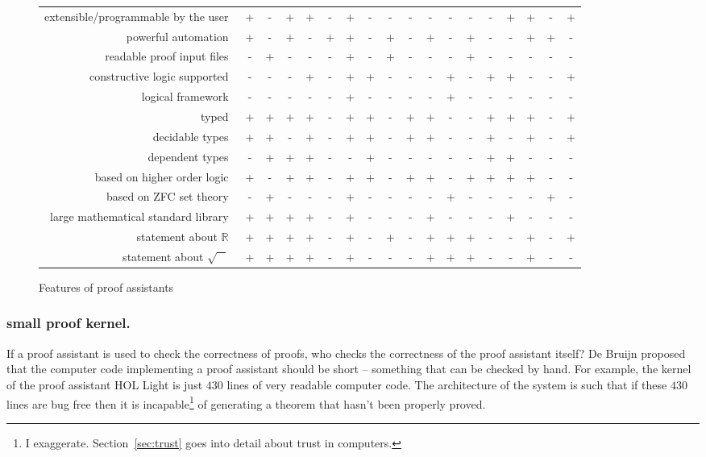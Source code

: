 \documentclass{llncs}
\newcommand{\ring}[1]{\mathbb{#1}}
\begin{document}
\begin{figure}
\begin{tabular}{|r|ccccc|ccccc|ccccc|cc|}
extensible/programmable by the user~
&+ &- &+ &+  &- &+ &- &-  &- &- &- &-  &- &+ &+ &-  &+ 
\\
powerful automation~
&+ &- &+ &-  &+ &+ &- &+  &- &+ &- &+  &- &- &+ &+  &- 
\\
readable proof input files~
&- &+ &- &-  &- &+ &- &+  &- &- &- &+  &- &- &- &-  &- 
\\
\hline
constructive logic supported~
&- &- &- &+  &- &+ &+ &-  &- &- &+ &-  &+ &+ &- &-  &+ 
\\
logical framework~
&- &- &- &-  &- &+ &- &-  &- &- &+ &-  &- &- &- &-  &- 
\\
typed~
&+ &+ &+ &+  &- &+ &+ &-  &+ &+ &- &-  &+ &+ &+ &-  &+ 
\\
decidable types~
&+ &+ &- &+  &- &+ &+ &-  &+ &+ &- &-  &+ &- &+ &-  &+ 
\\
dependent types~
&- &+ &+ &+  &- &- &+ &-  &- &- &- &-  &+ &+ &- &-  &- 
\\
\hline
based on higher order logic~
&+ &- &+ &+  &- &+ &+ &-  &+ &+ &- &+  &+ &+ &+ &-  &- 
\\
based on ZFC set theory~
&- &+ &- &-  &- &+ &- &-  &- &- &+ &-  &- &- &- &+  &- 
\\
large mathematical standard library~
&+ &+ &+ &+  &- &+ &- &-  &- &+ &- &-  &- &+ &- &-  &- 
\\
statement about $\ring{R}$~
&+ &+ &+ &+  &- &+ &- &+  &- &+ &+ &+  &- &- &+ &-  &+ 
\\
statement about $\sqrt{\phantom X}$~
&+ &+ &+ &+  &- &+ &- &-  &- &+ &+ &+  &- &- &+ &-  &- 
\\
\hline
\end{tabular}
\caption{Features of proof assistants~\cite{wiedijk:17}}
\label{fig:feature}
\end{figure}


\bigskip 




\subsubsection{small proof kernel.} If a proof assistant is used to
check the correctness of proofs, who checks the correctness of the
proof assistant itself?  De Bruijn proposed that the computer code
implementing a proof assistant should be short -- something that can
be checked by hand.  For example, the kernel of the proof assistant
HOL Light is just $430$ lines of very readable computer code.  The
architecture of the system is such that if these $430$ lines are bug
free then it is incapable\footnote{I
  exaggerate. Section~\ref{sec:trust} goes into detail about trust in
  computers.} of generating a theorem that hasn't been properly
proved.
\end{document}
